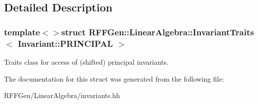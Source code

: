 \subsection{Detailed Description}
\subsubsection*{template$<$$>$struct R\-F\-F\-Gen\-::\-Linear\-Algebra\-::\-Invariant\-Traits$<$ Invariant\-::\-P\-R\-I\-N\-C\-I\-P\-A\-L $>$}

Traits class for access of (shifted) principal invariants. 

The documentation for this struct was generated from the following file\-:\begin{DoxyCompactItemize}
\item 
R\-F\-F\-Gen/\-Linear\-Algebra/invariants.\-hh\end{DoxyCompactItemize}
